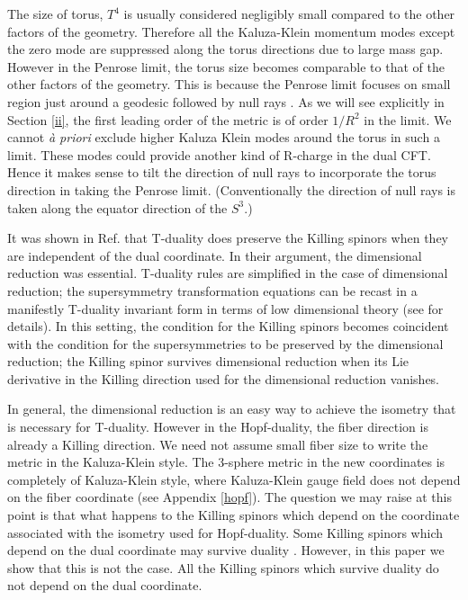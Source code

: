 \documentclass[a4paper,12pt]{article}
\begin{document}
The size of torus, $T^4$ is usually considered negligibly small compared to the other factors of the geometry. Therefore all the Kaluza-Klein momentum modes except the zero mode are suppressed along the torus directions due to large mass gap. However in the Penrose limit, the torus size becomes comparable to that of the other factors of the geometry. This is because the Penrose limit focuses on small region just around a geodesic followed by null rays \cite{penrose}. As we will see explicitly in Section \ref{ii}, the first leading order of the metric is of order $1/R^2$ in the limit. We cannot {\it \`{a} priori} exclude higher Kaluza Klein modes around the torus in such a limit. These modes could provide another kind of R-charge in the dual CFT. Hence it makes sense to tilt the direction of null rays to incorporate the torus direction in taking the Penrose limit. (Conventionally the direction of null rays is taken along the equator direction of the $S^3$.)

It was shown in Ref. \cite{bergshoeff} that T-duality does preserve the Killing spinors when they are independent of the dual coordinate. In their argument, the dimensional reduction was essential. T-duality rules are simplified in the case of dimensional reduction; the supersymmetry transformation equations can be recast in a manifestly T-duality invariant form in terms of low dimensional theory (see \cite{bergshoeff} for details). In this setting, the condition for the Killing spinors becomes coincident with the condition for the supersymmetries to be preserved by the dimensional reduction; the Killing spinor survives dimensional reduction when its Lie derivative in the Killing direction used for the dimensional reduction vanishes. 

In general, the dimensional reduction is an easy way to achieve the isometry that is necessary for T-duality. However in the Hopf-duality, the fiber direction is already a Killing direction. We need not assume small fiber size to write the metric in the Kaluza-Klein style. The 3-sphere metric in the new coordinates is completely of Kaluza-Klein style, where Kaluza-Klein gauge field does not depend on the fiber coordinate (see Appendix \ref{hopf}). The question we may raise at this point is that what happens to the Killing spinors which depend on the coordinate associated with the isometry used for Hopf-duality. Some Killing spinors which depend on the dual coordinate may survive duality \cite{gueven2}. However, in this paper we show that this is not the case. All the Killing spinors which survive duality do not depend on the dual coordinate.
\end{document}
